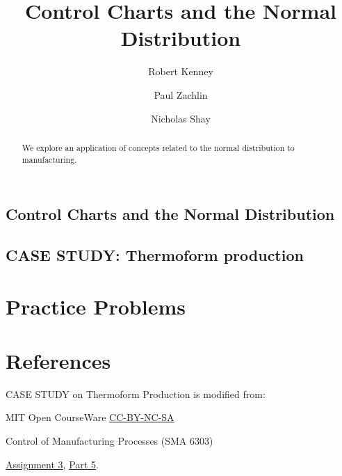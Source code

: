 \documentclass{ximera}
\author{Robert Kenney \and Paul Zachlin \and Nicholas Shay}
\title{Control Charts and the Normal Distribution} \license{CC BY-NC-SA 4.0}
\begin{document}
\begin{abstract}
We explore an application of concepts related to the normal distribution to manufacturing.
\end{abstract}
\maketitle

\begin{onlineOnly}
\section*{Control Charts and the Normal Distribution}
\end{onlineOnly}

\subsection*{CASE STUDY: Thermoform production}



\section*{Practice Problems}

\section*{References}

CASE STUDY on Thermoform Production is modified from:

MIT Open CourseWare \href{https://creativecommons.org/licenses/by-nc-sa/4.0/}{CC-BY-NC-SA}

Control of Manufacturing Processes (SMA 6303)

\href{https://ocw.mit.edu/courses/2-830j-control-of-manufacturing-processes-sma-6303-spring-2008/resources/ps3/}{Assignment 3}, \href{https://ocw.mit.edu/courses/2-830j-control-of-manufacturing-processes-sma-6303-spring-2008/resources/35/}{Part 5}. 
\end{document}
